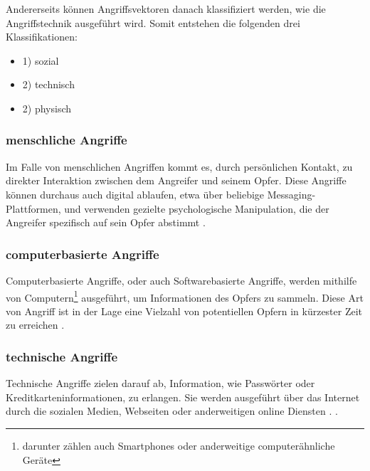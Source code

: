 Andererseits können Angriffsvektoren danach klassifiziert werden, wie die Angriffstechnik ausgeführt wird.
Somit entstehen die folgenden drei Klassifikationen:

\begin{minipage}{.5\linewidth}
    \begin{itemize}
        \setlength\itemsep{1em}
        \item 1) sozial
        \item 2) technisch
        \item 2) physisch
    \end{itemize}
\end{minipage}
\hfill
\begin{minipage}{.5\linewidth}
    \centering
\end{minipage}

\subsubsection{menschliche Angriffe}
Im Falle von menschlichen Angriffen kommt es, durch persönlichen Kontakt, zu direkter Interaktion zwischen dem Angreifer und seinem Opfer.
Diese Angriffe können durchaus auch digital ablaufen, etwa über beliebige Messaging-Plattformen, und verwenden gezielte psychologische Manipulation,
die der Angreifer spezifisch auf sein Opfer abstimmt .

\subsubsection{computerbasierte Angriffe}
Computerbasierte Angriffe, oder auch Softwarebasierte Angriffe, werden mithilfe von Computern\footnote{darunter zählen auch Smartphones oder anderweitige computerähnliche Geräte}
ausgeführt, um Informationen des Opfers zu sammeln. Diese Art von Angriff ist in der Lage eine Vielzahl
von potentiellen Opfern in kürzester Zeit zu erreichen .

\subsubsection{technische Angriffe}
Technische Angriffe zielen darauf ab, Information, wie Passwörter oder Kreditkarteninformationen, zu erlangen. Sie werden ausgeführt über das Internet durch die sozialen Medien,
Webseiten oder anderweitigen online Diensten . .

